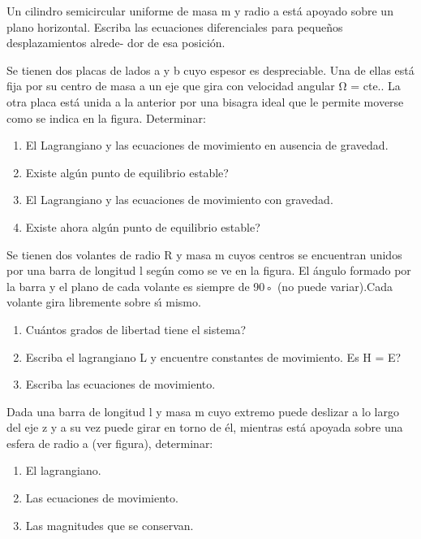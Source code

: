 \documentclass[10pt,oneside]{CBFT_book}
\begin{document}
\begin{ejercicios}
\label{ej6}
\item{ \bf }
Un cilindro semicircular uniforme de masa m y radio a está apoyado sobre un plano
horizontal. Escriba las ecuaciones diferenciales para pequeños desplazamientos alrede-
dor de esa posición.

\label{ej7}
\item{ \bf }
Se tienen dos placas de lados a y b cuyo espesor es despreciable. Una de ellas está fija
por su centro de masa a un eje que gira con velocidad angular Ω = cte.. La otra placa
está unida a la anterior por una bisagra ideal que le permite moverse como se indica
en la figura. Determinar:
\begin{enumerate}[label=(\alph*)]
\item El Lagrangiano y las ecuaciones de movimiento en ausencia de gravedad.
\item Existe algún punto de equilibrio estable?
\item El Lagrangiano y las ecuaciones de movimiento con gravedad.
\item Existe ahora algún punto de equilibrio estable?
\end{enumerate}

\label{ej8}
\item{ \bf }
Se tienen dos volantes de radio R y masa m cuyos centros se encuentran unidos por una
barra de longitud l según como se ve en la figura. El ángulo formado por la barra y el
plano de cada volante es siempre de 90◦ (no puede variar).Cada volante gira libremente
sobre sı́ mismo.
\begin{enumerate}[label=(\alph*)]
\item Cuántos grados de libertad tiene el sistema?
\item Escriba el lagrangiano L y encuentre constantes de movimiento. Es H = E?
\item Escriba las ecuaciones de movimiento.
\end{enumerate}


\label{ej9}
\item{ \bf }
Dada una barra de longitud l y masa m cuyo extremo puede deslizar a lo largo del
eje z y a su vez puede girar en torno de él, mientras está apoyada sobre una esfera de
radio a (ver figura), determinar:
\begin{enumerate}[label=(\alph*)]
\item El lagrangiano.
\item Las ecuaciones de movimiento.
\item Las magnitudes que se conservan.
\end{enumerate}



\end{ejercicios}
\end{document}
